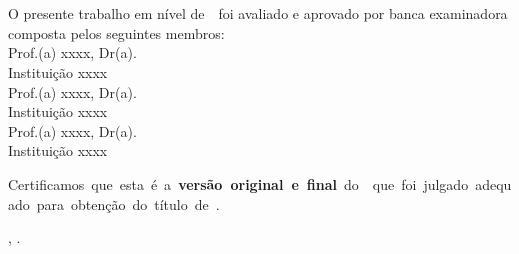 \begin{folhadeaprovacao}
	\OnehalfSpacing
	\centering
	\imprimirautor\\%
	\vspace*{10pt}		
	\textbf{\imprimirtitulo}%
	\ifnotempty{\imprimirsubtitulo}{:~\imprimirsubtitulo}\\%
	\vspace*{\baselineskip}
	O presente trabalho em nível de~\imprimirnivel~foi avaliado e aprovado por banca examinadora composta pelos seguintes membros:\\
	\vspace*{\baselineskip}
	Prof.(a) xxxx, Dr(a).\\
	Instituição xxxx\\
	\vspace*{\baselineskip}
	Prof.(a) xxxx, Dr(a).\\
	Instituição xxxx\\
	\vspace*{\baselineskip}
	Prof.(a) xxxx, Dr(a).\\
	Instituição xxxx\\
	\vspace*{2\baselineskip}
	\begin{minipage}{\textwidth}
		Certificamos~que~esta~é~a~\textbf{versão~original~e~final}~do~\imprimirtipotrabalho~que~foi~julgado~adequado~para~obtenção~do~título~de~\imprimirformacao.\\
	\end{minipage}
	\vspace*{\fill}
	\vspace*{\fill}
	\assinatura{\OnehalfSpacing\imprimirorientador \\ \imprimirorientadorRotulo}
	\vspace*{\fill}
	\imprimirlocal, \imprimirano.
\end{folhadeaprovacao}